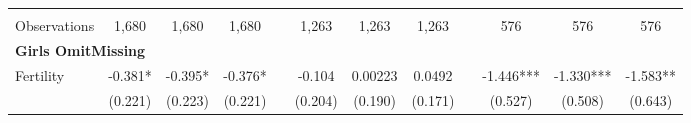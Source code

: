 \begin{landscape}
\begin{table}[htpb!]
\begin{center}
\begin{tabular}{lcccp{2mm}cccp{2mm}ccc}
\begin{footnotesize}\end{footnotesize}&\begin{footnotesize}\end{footnotesize}&\begin{footnotesize}\end{footnotesize}&\begin{footnotesize}\end{footnotesize}&\begin{footnotesize}\end{footnotesize}&\begin{footnotesize}\end{footnotesize}&\begin{footnotesize}\end{footnotesize}&\begin{footnotesize}\end{footnotesize}&\begin{footnotesize}\end{footnotesize}&\begin{footnotesize}\end{footnotesize}&\begin{footnotesize}\end{footnotesize}&\begin{footnotesize}\end{footnotesize}\\Observations&1,680&1,680&1,680&&1,263&1,263&1,263&&576&576&576\\
\multicolumn{12}{l}{\textbf{Girls OmitMissing}}\\ 
Fertility&-0.381*&-0.395*&-0.376*&&-0.104&0.00223&0.0492&&-1.446***&-1.330***&-1.583**\\
&(0.221)&(0.223)&(0.221)&&(0.204)&(0.190)&(0.171)&&(0.527)&(0.508)&(0.643)\\

\end{tabular}
\end{center}
\end{table}
\end{landscape}
